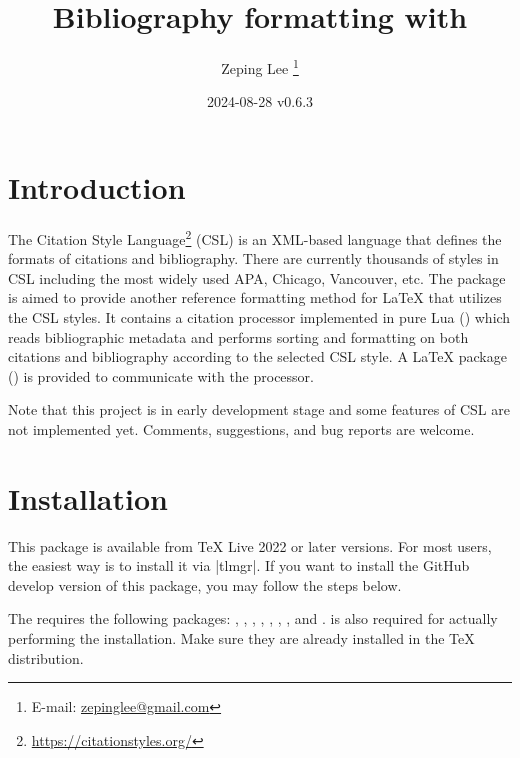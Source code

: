 \documentclass{l3doc}
\begin{document}
\title{%
  Bibliography formatting with 
}

\author{%
  Zeping Lee%
  \thanks{%
    E-mail:
    \href{mailto:zepinglee@gmail.com}
      {zepinglee@gmail.com}%
  }%
}

\date{2024-08-28 v0.6.3}

\maketitle


\begin{documentation}

\section{Introduction}

The Citation Style Language\footnote{\url{https://citationstyles.org/}} (CSL)
is an XML-based language that defines the formats of citations and bibliography.
There are currently thousands of styles in CSL including the most widely used
APA, Chicago, Vancouver, etc.
The  package is aimed to provide another reference formatting method
for LaTeX that utilizes the CSL styles.
It contains a citation processor implemented in pure Lua ()
which reads bibliographic metadata and performs sorting and formatting on both
citations and bibliography according to the selected CSL style.
A LaTeX package () is provided to communicate with the processor.

Note that this project is in early development stage and some features of CSL
are not implemented yet.
Comments, suggestions, and bug reports are welcome.


\section{Installation}

This package is available from TeX Live 2022 or later versions.
For most users, the easiest way is to install it via |tlmgr|.
If you want to install the GitHub develop version of this package,
you may follow the steps below.

The  requires the following packages:
, , , , ,
, , and .
 is also required for actually performing the installation.
Make sure they are already installed in the TeX distribution.


\end{documentation}
\end{document}
